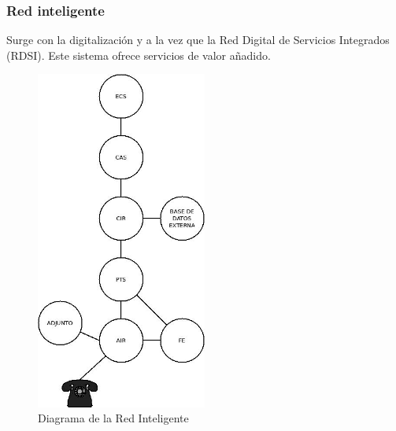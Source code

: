 \subsubsection{Red inteligente}
Surge con la digitalización y a la vez que la Red Digital de Servicios Integrados (\acrshort{RDSI}). Este sistema ofrece servicios de valor añadido.
\begin{figure}[H]
\centering
\includegraphics[width=0.5\textwidth]{Imagen/diaredinteligente.jpg}
\caption{Diagrama de la Red Inteligente}
\end{figure}
